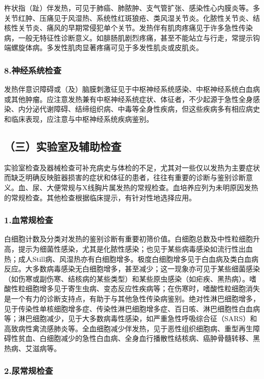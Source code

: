 杵状指（趾）伴发热，可见于肺癌、肺脓肿、支气管扩张、感染性心内膜炎等。多关节红肿、压痛见于风湿热、系统性红斑狼疮、类风湿关节炎。化脓性关节炎、结核性关节炎、痛风的早期常侵犯单个关节。发热伴有肌肉疼痛见于许多急性传染病，一般无特征性诊断意义。如腓肠肌剧烈疼痛，甚至不能站立与行走，常提示钩端螺旋体病。多发性肌肉显著疼痛可见于多发性肌炎或皮肌炎。

\subsubsection{8.神经系统检查}

发热伴意识障碍或（及）脑膜刺激征见于中枢神经系统感染、中枢神经系统白血病或其他肿瘤。应注意发热兼有中枢神经系统症状、体征者，不少起源于急性全身感染、内分泌代谢障碍、结缔组织病、中毒等全身性疾病，但这些疾病多有相应病史和临床表现，应注意与中枢神经系统疾病鉴别。

\subsection{（三）实验室及辅助检查}

实验室检查及器械检查可补充病史与体检的不足，尤其对一些仅以发热为主要症状而缺乏明确反映脏器损害的症状和体征的患者，往往有重要的诊断与鉴别诊断意义。血、尿、大便常规与X线胸片属发热的常规检查。血培养应列为未明原因发热的常规检查。其他检查根据临床提示，有针对性地选择应用。

\subsubsection{1.血常规检查}

白细胞计数及分类对发热的鉴别诊断有重要初筛价值。白细胞总数及中性粒细胞升高，提示为细菌性感染，尤其是化脓性感染；也见于某些病毒感染如流行性出血热；成人Still病、风湿热亦有白细胞增多。极度白细胞增多见于白血病及类白血病反应。大多数病毒感染无白细胞增多，甚至减少；这一现象亦可见于某些细菌感染（如伤寒或副伤寒、结核病的某些类型）和某些原虫感染（如疟疾、黑热病）。嗜酸性粒细胞增多见于寄生虫病、变态反应性疾病等；在伤寒时，嗜酸性粒细胞消失是一个有力的诊断支持点，有助于与其他急性传染病鉴别。绝对性淋巴细胞增多，见于传染性单核细胞增多症、传染性淋巴细胞增多症、百日咳、淋巴细胞性白血病等；淋巴细胞减少，见于大多数病毒性感染，如严重急性呼吸综合征（SARS）和高致病性禽流感肺炎等。全血细胞减少伴发热，见于恶性组织细胞病、重型再生障碍性贫血、白细胞减少的急性白血病、全身血行播散性结核病、癌肿骨髓转移、黑热病、艾滋病等。

\subsubsection{2.尿常规检查}

